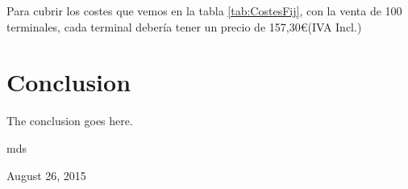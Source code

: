 \documentclass[10pt,journal,compsoc]{IEEEtran}
\begin{document}
Para cubrir los costes que vemos en la tabla \ref{tab:CostesFij}, con la venta de 100 terminales, cada terminal debería tener un precio de 157,30\euro (IVA Incl.)

\section{Conclusion}
The conclusion goes here.

\hfill mds
 
\hfill August 26, 2015

\end{document}
